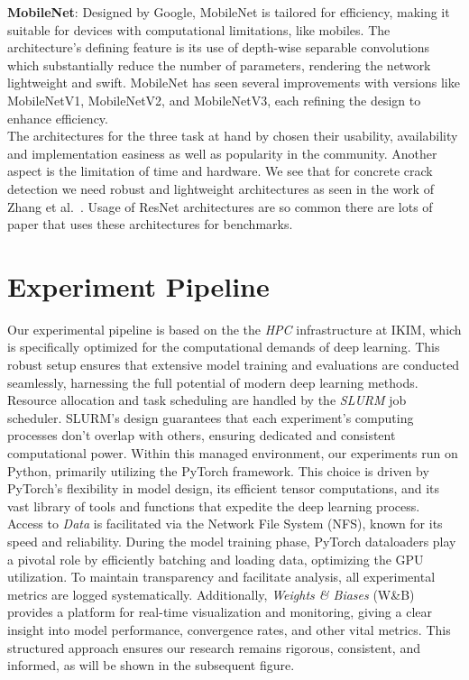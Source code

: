 \textbf{MobileNet}:
Designed by Google, MobileNet is tailored for efficiency, making it suitable for devices with computational limitations, like mobiles. The architecture's defining feature is its use of depth-wise separable convolutions which substantially reduce the number of parameters, rendering the network lightweight and swift. MobileNet has seen several improvements with versions like MobileNetV1, MobileNetV2, and MobileNetV3, each refining the design to enhance efficiency.\\

The architectures for the three task at hand by chosen their usability, availability and implementation easiness as well as popularity in the community. Another aspect is the limitation of time and hardware. We see that for concrete crack detection we need robust and lightweight architectures as seen in the work of Zhang et al.~\cite{ZHANG2023131941}. Usage of ResNet architectures are so common there are lots of paper that uses these architectures for benchmarks.

\section{Experiment Pipeline}

Our experimental pipeline is based on the the \emph{HPC} infrastructure at IKIM, which is specifically optimized for the computational demands of deep learning. This robust setup ensures that extensive model training and evaluations are conducted seamlessly, harnessing the full potential of modern deep learning methods.\\

Resource allocation and task scheduling are handled by the \emph{SLURM} job scheduler. SLURM's design guarantees that each experiment's computing processes don't overlap with others, ensuring dedicated and consistent computational power. Within this managed environment, our experiments run on Python, primarily utilizing the PyTorch framework. This choice is driven by PyTorch's flexibility in model design, its efficient tensor computations, and its vast library of tools and functions that expedite the deep learning process.\\

Access to \emph{Data} is facilitated via the Network File System (NFS), known for its speed and reliability. During the model training phase, PyTorch dataloaders play a pivotal role by efficiently batching and loading data, optimizing the GPU utilization. To maintain transparency and facilitate analysis, all experimental metrics are logged systematically. Additionally, \emph{Weights \& Biases} (W\&B) provides a platform for real-time visualization and monitoring, giving a clear insight into model performance, convergence rates, and other vital metrics. This structured approach ensures our research remains rigorous, consistent, and informed, as will be shown in the subsequent figure.\\



